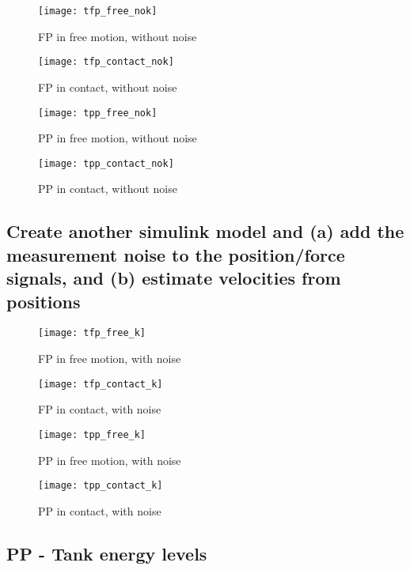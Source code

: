 \begin{figure}[H]
\begin{minipage}{0.5\textwidth}
\centering
\texttt{[image: tfp\_free\_nok]}
\caption{FP in free motion, without noise}
\label{fig:tfp_free_nok}

\texttt{[image: tfp\_contact\_nok]}
\caption{FP in contact, without noise}
\label{fig:tfp_contact_k}
\end{minipage}
\begin{minipage}{0.5\textwidth}
\centering
\texttt{[image: tpp\_free\_nok]}
\caption{PP in free motion, without noise}
\label{fig:tpp_free_nok}

\texttt{[image: tpp\_contact\_nok]}
\caption{PP in contact, without noise}
\label{fig:tpp_contact_nok}
\end{minipage}
\end{figure}

\subsection{Create another simulink model and (a) add the measurement noise to the position/force signals, and (b) estimate velocities from positions}

\begin{figure}[H]
\begin{minipage}{0.5\textwidth}
\centering
\texttt{[image: tfp\_free\_k]}
\caption{FP in free motion, with noise}
\label{fig:spp_free_nok}

\texttt{[image: tfp\_contact\_k]}
\caption{FP in contact, with noise}
\label{fig:spp_free_k}
\end{minipage}
\begin{minipage}{0.5\textwidth}
\centering
\texttt{[image: tpp\_free\_k]}
\caption{PP in free motion, with noise}
\label{fig:spp_contact_nok}

\texttt{[image: tpp\_contact\_k]}
\caption{PP in contact, with noise}
\label{fig:spp_contact_k}
\end{minipage}
\end{figure}

\subsection{PP - Tank energy levels}

